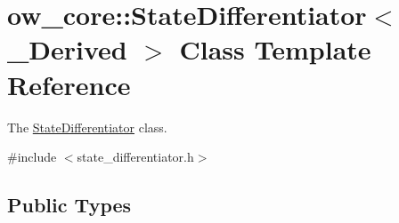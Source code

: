 \hypertarget{classow__core_1_1StateDifferentiator}{}\section{ow\+\_\+core\+:\+:State\+Differentiator$<$ \+\_\+\+Derived $>$ Class Template Reference}
\label{classow__core_1_1StateDifferentiator}


The \hyperlink{classow__core_1_1StateDifferentiator}{State\+Differentiator} class.  




{\ttfamily \#include $<$state\+\_\+differentiator.\+h$>$}

\subsection*{Public Types}
